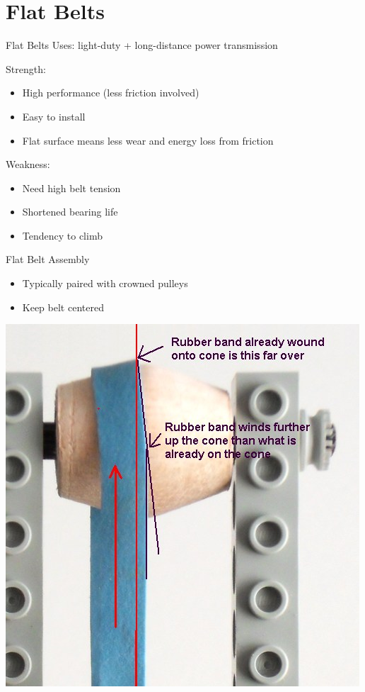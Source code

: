 \documentclass[10pt, svgnames]{beamer}
\begin{document}
\section{Flat Belts}
\label{sec:org2545be6}

\begin{frame}[label={sec:orgc4d88e0}]{Flat Belts}
Uses: light-duty + long-distance power transmission

Strength:
\begin{itemize}
\item High performance (less friction involved)
\item Easy to install
\item Flat surface means less wear and energy loss from friction
\end{itemize}

Weakness:
\begin{itemize}
\item Need high belt tension
\item Shortened bearing life
\item Tendency to climb
\end{itemize}
\end{frame}

\begin{frame}[label={sec:orgb586fc7}]{Flat Belt Assembly}
\begin{itemize}
\item Typically paired with crowned pulleys
\item Keep belt centered
\end{itemize}

\begin{center}
\includegraphics[height=0.8\textheight]{./pictures/crowned-pulley.jpg}
\end{center}
\end{frame}
\end{document}
